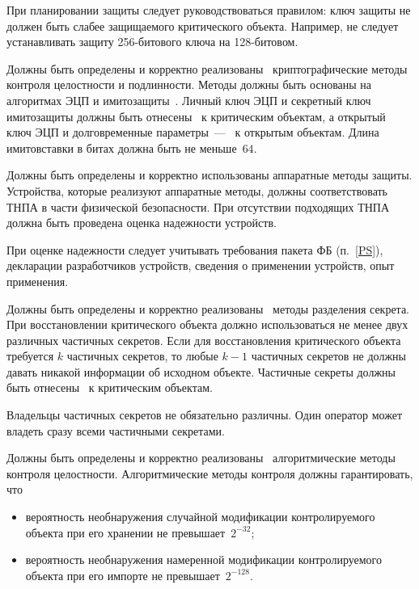 \begin{note}
При планировании защиты следует руководствоваться правилом:
ключ защиты не должен быть слабее защищаемого критического объекта. 
%
Например, не следует устанавливать защиту 256-битового ключа на 128-битовом. 
\end{note}

\label{R.DP.CryptoI} %
Должны быть определены и корректно 
реализованы~ 
криптографические методы контроля
целостности и подлинности. Методы должны быть основаны на алгоритмах 
ЭЦП и имитозащиты~.
%
Личный ключ ЭЦП и секретный ключ имитозащиты должны быть 
отнесены~ к критическим объектам, а открытый ключ ЭЦП и 
долговременные параметры~--- ~к открытым объектам.
%
Длина имитовставки в битах должна быть не меньше~$64$.

\label{R.DP.Hard} %
Должны быть определены и корректно использованы аппаратные методы защиты.
Устройства, которые реализуют аппаратные методы, 
должны соответствовать ТНПА в части физической безопасности.
%
При отсутствии подходящих ТНПА должна быть проведена оценка надежности
устройств.

\begin{note}
При оценке надежности следует учитывать требования пакета ФБ (п.~\ref{PS}),
декларации разработчиков устройств, сведения о применении устройств, опыт 
применения.
\end{note}

\label{R.DP.Split} %
Должны быть определены и корректно
реализованы~  методы разделения
секрета. При восстановлении критического объекта должно использоваться не менее
двух различных частичных секретов.
%
Если для восстановления критического объекта требуется $k$ частичных секретов,
то любые $k-1$ частичных секретов не должны давать никакой информации об 
исходном объекте.
%
Частичные секреты должны быть отнесены~ к критическим объектам.

\begin{note}
Владельцы частичных секретов не обязательно различны. 
Один оператор может владеть сразу всеми частичными секретами.
\end{note}

\label{R.DP.Algo} %
Должны быть определены и корректно 
реализованы~ алгоритмические методы 
контроля целостности.
%
Алгоритмические методы контроля должны гарантировать, что
\begin{itemize}
\item
вероятность необнаружения случайной модификации контролируемого 
объекта при его хранении не превышает~$2^{-32}$;
\item
вероятность необнаружения намеренной модификации контролируемого 
объекта при его импорте не превышает~$2^{-128}$.
\end{itemize}

